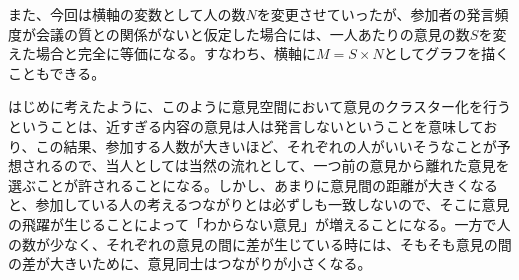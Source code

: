 また、今回は横軸の変数として人の数$N$を変更させていったが、参加者の発言頻度が会議の質との関係がないと仮定した場合には、一人あたりの意見の数$S$を変えた場合と完全に等価になる。すなわち、横軸に$M=S\times N$としてグラフを描くこともできる。

はじめに考えたように、このように意見空間において意見のクラスター化を行うということは、近すぎる内容の意見は人は発言しないということを意味しており、この結果、参加する人数が大きいほど、それぞれの人がいいそうなことが予想されるので、当人としては当然の流れとして、一つ前の意見から離れた意見を選ぶことが許されることになる。しかし、あまりに意見間の距離が大きくなると、参加している人の考えるつながりとは必ずしも一致しないので、そこに意見の飛躍が生じることによって「わからない意見」が増えることになる。一方で人の数が少なく、それぞれの意見の間に差が生じている時には、そもそも意見の間の差が大きいために、意見同士はつながりが小さくなる。


